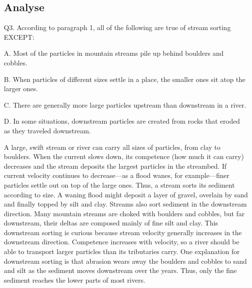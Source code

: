 \subsection{Analyse}

\begin{blk}
    \begin{qst}
        Q3. According to paragraph 1, all of the following are true of stream sorting EXCEPT:
    \end{qst}

    \begin{chc}
        A. Most of the particles in mountain streams pile up behind boulders and cobbles.

        B. When particles of different sizes settle in a place, the smaller ones sit atop the larger ones.

        C. There are generally more large particles upstream than downstream in a river.

        D. In some situations, downstream particles are created from rocks that eroded as they traveled downstream.
    \end{chc}

    \begin{psgq}
        A large, swift stream or river can carry all sizes of particles, from clay to boulders. When the current slows down, its competence (how much it can carry) decreases and the stream deposits the largest particles in the streambed. If current velocity continues to decrease—as a flood wanes, for example—finer particles settle out on top of the large ones. Thus, a stream sorts its sediment according to size. A waning flood might deposit a layer of gravel, overlain by sand and finally topped by silt and clay. Streams also sort sediment in the downstream direction. Many mountain streams are choked with boulders and cobbles, but far downstream, their deltas are composed mainly of fine silt and clay. This downstream sorting is curious because stream velocity generally increases in the downstream direction. Competence increases with velocity, so a river should be able to transport larger particles than its tributaries carry. One explanation for downstream sorting is that abrasion wears away the boulders and cobbles to sand and silt as the sediment moves downstream over the years. Thus, only the fine sediment reaches the lower parts of most rivers.
    \end{psgq}


\end{blk}
